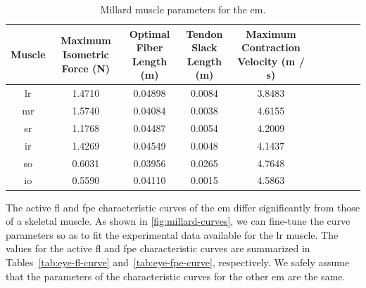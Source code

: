 \documentclass[11pt,a4paper,draft=false]{report}
\begin{document}
\begin{table}[ht]
  \centering
  \caption{Millard muscle parameters for the
    \gls{em}.}\label{tab:eye-muscle-parameters}
  \begin{tabular}{@{}cccccccccc@{}}
    \toprule
    \thead{Muscle \\ \quad}
    & \thead{Maximum Isometric \\ Force (N)}  %
    & \thead{Optimal Fiber \\ Length (m)}
    & \thead{Tendon Slack \\ Length (m)}
    & \thead{Maximum Contraction \\ Velocity (m / s)} \\
    \midrule
    \gls{lr} & 1.4710 & 0.04898 & 0.0084 & 3.8483 \\
    \gls{mr} & 1.5740 & 0.04084 & 0.0038 & 4.6155 \\
    \gls{sr} & 1.1768 & 0.04487 & 0.0054 & 4.2009 \\
    \gls{ir} & 1.4269 & 0.04549 & 0.0048 & 4.1437 \\
    \gls{so} & 0.6031 & 0.03956 & 0.0265 & 4.7648 \\
    \gls{io} & 0.5590 & 0.04110 & 0.0015 & 4.5863 \\
    \bottomrule
  \end{tabular}
\end{table}

The active \gls{fl} and \gls{fpe} characteristic curves of the \gls{em} differ
significantly from those of a skeletal muscle. As shown in
\autoref{fig:millard-curves}, we can fine-tune the curve parameters so as to fit
the experimental data available for the \gls{lr} muscle. The values for the
active \gls{fl} and \gls{fpe} characteristic curves are summarized in
Tables~\ref{tab:eye-fl-curve} and~\ref{tab:eye-fpe-curve}, respectively. We
safely assume that the parameters of the characteristic curves for the other
\gls{em} are the same.
\end{document}
